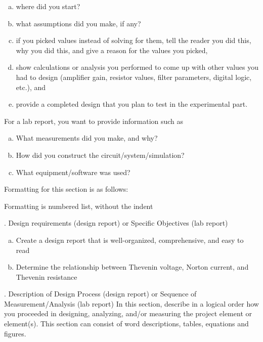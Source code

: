 \documentclass[11pt]{ECEtemp}
\begin{document}
\begin{enumerate}[(a)]
    \itemsep0em %
    \item where did you start? 
    \item what assumptions did you make, if any? 
    \item if you picked values instead of solving for them, tell the reader you did this, why you did this, and give a reason for the values you picked, 
    \item show calculations or analysis you performed to come up with other values you had to design (amplifier gain, resistor values, filter parameters, digital logic, etc.), and 
    \item  provide a completed design that you plan to test in the experimental part.
\end{enumerate}

For a lab report, you want to provide information such as
\begin{enumerate}[(a)]
\item What measurements did you make, and why?
\item How did you construct the circuit/system/simulation?
\item What equipment/software was used?
\end{enumerate}

\noindent
Formatting for this section is as follows:

\noindent
Formatting is numbered list, without the indent

. Design requirements (design report) or Specific Objectives (lab report)

\begin{enumerate}[(a)]
\item   Create a design report that is well-organized, comprehensive, and easy to read
\item   Determine the relationship between Thevenin voltage, Norton current, and Thevenin resistance
\end{enumerate}

. Description of Design Process (design report) or Sequence of Measurement/Analysis (lab report)
In this section, describe in a logical order how you proceeded in designing, analyzing, and/or measuring the project element or element(s). This section can consist of word descriptions, tables, equations and figures. 
\end{document}
